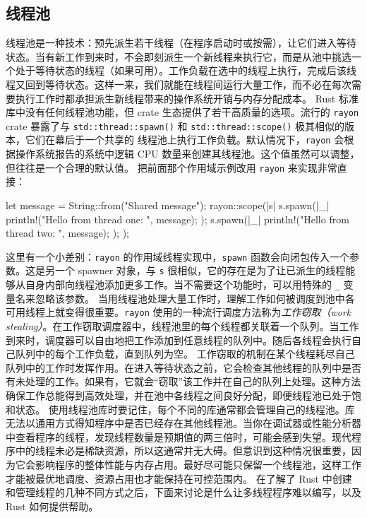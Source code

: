 \subsection{线程池}
\label{idx:idx_5903331b}
\label{idx:idx_d6e1609f}
线程池是一种技术：预先派生若干线程（在程序启动时或按需），让它们进入等待状态。当有新工作到来时，不会即刻派生一个新线程来执行它，而是从池中挑选一个处于等待状态的线程（如果可用）。工作负载在选中的线程上执行，完成后该线程又回到等待状态。这样一来，我们就能在线程间运行大量工作，而不必在每次需要执行工作时都承担派生新线程带来的操作系统开销与内存分配成本。
Rust 标准库中没有任何线程池功能，但 crate 生态提供了若干高质量的选项。流行的 \texttt{rayon} crate 暴露了与
\texttt{std::\allowbreak{}thread::\allowbreak{}spawn(\allowbreak{})\allowbreak{}} 和 \texttt{std::\allowbreak{}thread::\allowbreak{}scope(\allowbreak{})\allowbreak{}} 极其相似的版本，它们在幕后于一个共享的
线程池上执行工作负载。默认情况下，\texttt{rayon} 会根据操作系统报告的系统中逻辑 CPU 数量来创建其线程池。这个值虽然可以调整，但往往是一个合理的默认值。
把前面那个作用域示例改用 \texttt{rayon} 来实现非常直接：
\begin{codebox}[rust]
let message = String::from("Shared message");
rayon::scope(|s| {
    s.spawn(|_| {
        println!("Hello from thread one: {}", message);
    });
    s.spawn(|_| {
        println!("Hello from thread two: {}", message);
    });
});
\end{codebox}
这里有一个小差别：\texttt{rayon} 的作用域线程实现中，\texttt{spawn} 函数会向闭包传入一个参数。这是另一个 spawner 对象，与 \texttt{s} 很相似，它的存在是为了让已派生的线程能够从自身内部向线程池添加更多工作。当不需要这个功能时，可以用特殊的 \texttt{\_} 变量名来忽略该参数。
当用线程池处理大量工作时，理解工作如何被调度到池中各可用线程上就变得很重要。\texttt{rayon} 使用的一种流行调度方法称为\emph{工作窃取（work stealing）}。在工作窃取调度器中，线程池里的每个线程都关联着一个队列。当工作到来时，调度器可以自由地把工作添加到任意线程的队列中。随后各线程会执行自己队列中的每个工作负载，直到队列为空。
\label{idx:idx_83119f66}
\label{idx:idx_07b76883}
工作窃取的机制在某个线程耗尽自己队列中的工作时发挥作用。在进入等待状态之前，它会检查其他线程的队列中是否有未处理的工作。如果有，它就会“窃取”该工作并在自己的队列上处理。这种方法确保工作总能得到高效处理，并在池中各线程之间良好分配，即便线程池已处于饱和状态。
使用线程池库时要记住，每个不同的库通常都会管理自己的线程池。库无法以通用方式得知程序中是否已经存在其他线程池。当你在调试器或性能分析器中查看程序的线程，发现线程数量是预期值的两三倍时，可能会感到失望。现代程序中的线程未必是稀缺资源，所以这通常并无大碍。但意识到这种情况很重要，因为它会影响程序的整体性能与内存占用。最好尽可能只保留一个线程池，这样工作才能被最优地调度、资源占用也才能保持在可控范围内。
在了解了 Rust 中创建和管理线程的几种不同方式之后，下面来讨论是什么让多线程程序难以编写，以及 Rust 如何提供帮助。
